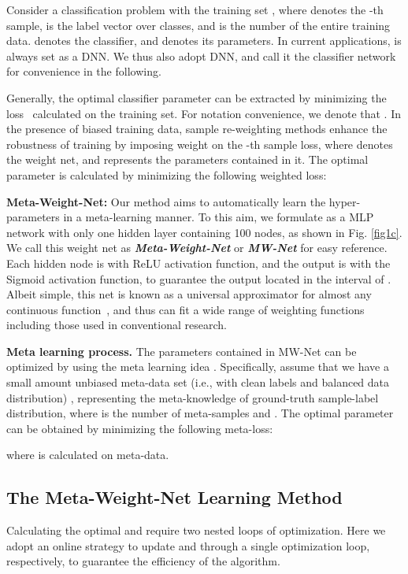 \documentclass{article}
\begin{document}
	Consider a classification problem with the training set ,  where  denotes the -th sample,  is the label vector over  classes, and  is the number of the entire training data.  denotes the classifier, and  denotes its parameters. In current applications,  is always set as a DNN. We thus also adopt DNN, and call it the classifier network for convenience in the following.
	
	Generally, the optimal classifier parameter  can be extracted by minimizing the loss  \  calculated on the training set. For notation convenience, we denote that .
	In the presence of biased training data, sample re-weighting methods enhance the robustness of training by imposing weight  on the -th sample loss, where  denotes the weight net, and  represents the parameters contained in it. The optimal parameter  is calculated by minimizing the following weighted loss: \vspace{-1.5mm}
	
	\textbf{Meta-Weight-Net:} Our method aims to automatically learn the hyper-parameters  in a meta-learning manner. To this aim, we formulate  as a MLP network with only one hidden layer containing 100 nodes, as shown in Fig. \ref{fig1c}. We call this weight net as \textbf{\emph{Meta-Weight-Net}} or \textbf{\emph{MW-Net}} for easy reference. Each hidden node is with ReLU activation function, and the output is with the Sigmoid activation function, to guarantee the output located in the interval of . Albeit simple, this net is known as a universal approximator for almost any continuous function~\cite{csaji2001approximation}, and thus can fit a wide range of weighting functions including those used in conventional research.
	
	\textbf{Meta learning process.}
	The parameters contained in MW-Net can be optimized by using the meta learning idea \cite{wu2018learning,andrychowicz2016learning,dehghani2017learning,franceschi2018bilevel}.
	Specifically, assume that we have a small amount unbiased meta-data set (i.e., with clean labels and balanced data distribution) , representing the meta-knowledge of ground-truth sample-label distribution, where  is the number of meta-samples and . The optimal parameter  can be obtained by minimizing the following meta-loss: \vspace{-2mm}
	  
	where  is calculated on meta-data. \vspace{-2mm}
	
	\subsection{The Meta-Weight-Net Learning Method}  
	Calculating the optimal  and  require two nested loops of optimization. Here we adopt an online strategy to update  and  through a single optimization loop, respectively, to guarantee the efficiency of the algorithm.
	
\end{document}

